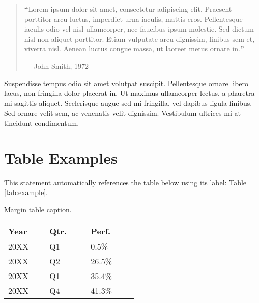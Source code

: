 \documentclass[
	a4paper, %
	12pt, %
]{CSSullivanBusinessReport}
\begin{document}
\begin{quote}
	\textbf{\LARGE ``}Lorem ipsum dolor sit amet, consectetur adipiscing elit. Praesent porttitor arcu luctus, imperdiet urna iaculis, mattis eros. Pellentesque iaculis odio vel nisl ullamcorper, nec faucibus ipsum molestie. Sed dictum nisl non aliquet porttitor. Etiam vulputate arcu dignissim, finibus sem et, viverra nisl. Aenean luctus congue massa, ut laoreet metus ornare in.\textbf{''}
	
	\hfill--- John Smith, 1972
\end{quote}

Suspendisse tempus odio sit amet volutpat suscipit. Pellentesque ornare libero lacus, non fringilla dolor placerat in. Ut maximus ullamcorper lectus, a pharetra mi sagittis aliquet. Scelerisque augue sed mi fringilla, vel dapibus ligula finibus. Sed ornare velit sem, ac venenatis velit dignissim. Vestibulum ultrices mi at tincidunt condimentum.


\section{Table Examples}

This statement automatically references the table below using its label: Table \ref{tab:example}.


\begin{margintable} %
	\footnotesize %
	\caption{Margin table caption.}
	\begin{tabular}{L{0.22\linewidth} C{0.22\linewidth} R{0.25\linewidth}}
		\toprule
		\textbf{Year} & \textbf{Qtr.} & \textbf{Perf.}\\
		\midrule
		20XX & Q1 & 0.5\%\\
		20XX & Q2 & 26.5\%\\
		20XX & Q1 & 35.4\%\\
		20XX & Q4 & 41.3\%\\
		\bottomrule
	\end{tabular}
\end{margintable}

\end{document}
